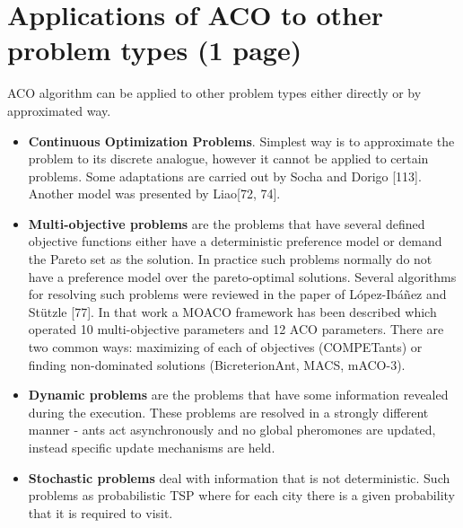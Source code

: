 \section{Applications of ACO to other problem types (1 page)}
ACO algorithm can be applied to other problem types either directly or by approximated way.

\begin{itemize}
\item \textbf{Continuous Optimization Problems}. Simplest way is to approximate the problem to its discrete analogue, however it cannot be applied to certain problems. Some adaptations are carried out by Socha and Dorigo [113]. Another model was presented by Liao[72, 74].

\item \textbf{Multi-objective problems} are the problems that have several defined objective functions either have a deterministic preference model or demand the Pareto set as the solution. In practice such problems normally do not have a preference model over the pareto-optimal solutions. Several algorithms for resolving such problems were reviewed in the paper of López-Ibáñez and Stützle [77]. In that work a MOACO framework has been described which operated 10 multi-objective parameters and 12 ACO parameters. There are two common ways: maximizing of each of objectives (COMPETants) or finding non-dominated solutions (BicreterionAnt, MACS, mACO-3).

\item \textbf{Dynamic problems} are the problems that have some information revealed during the execution. These problems are resolved in a strongly different manner - ants act asynchronously and no global pheromones are updated, instead specific update mechanisms are held.

\item \textbf{Stochastic problems} deal with information that is not deterministic. Such problems as probabilistic TSP where for each city there is a given probability that it is required to visit.
\end{itemize}
